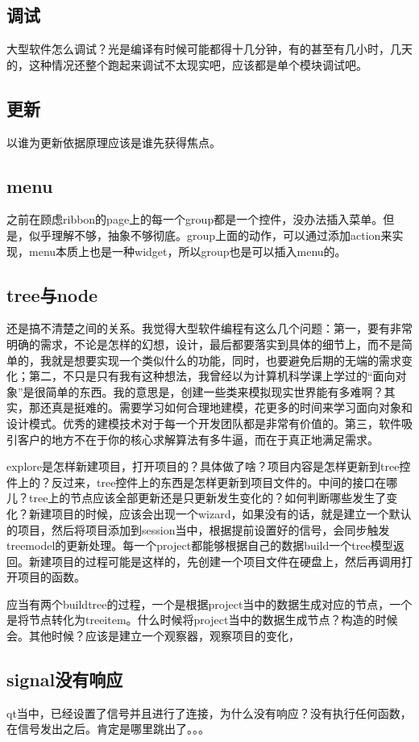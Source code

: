 \subsection{调试}
大型软件怎么调试？光是编译有时候可能都得十几分钟，有的甚至有几小时，几天的，这种情况还整个跑起来调试不太现实吧，应该都是单个模块调试吧。
\subsection{更新}
以谁为更新依据原理应该是谁先获得焦点。

\subsection{menu}
之前在顾虑ribbon的page上的每一个group都是一个控件，没办法插入菜单。但是，似乎理解不够，抽象不够彻底。group上面的动作，可以通过添加action来实现，menu本质上也是一种widget，所以group也是可以插入menu的。
\subsection{tree与node}
还是搞不清楚之间的关系。我觉得大型软件编程有这么几个问题：第一，要有非常明确的需求，不论是怎样的幻想，设计，最后都要落实到具体的细节上，而不是简单的，我就是想要实现一个类似什么的功能，同时，也要避免后期的无端的需求变化；第二，不只是只有我有这种想法，我曾经以为计算机科学课上学过的“面向对象”是很简单的东西。我的意思是，创建一些类来模拟现实世界能有多难啊？其实，那还真是挺难的。需要学习如何合理地建模，花更多的时间来学习面向对象和设计模式。优秀的建模技术对于每一个开发团队都是非常有价值的。第三，软件吸引客户的地方不在于你的核心求解算法有多牛逼，而在于真正地满足需求。

explore是怎样新建项目，打开项目的？具体做了啥？项目内容是怎样更新到tree控件上的？反过来，tree控件上的东西是怎样更新到项目文件的。中间的接口在哪儿？tree上的节点应该全部更新还是只更新发生变化的？如何判断哪些发生了变化？新建项目的时候，应该会出现一个wizard，如果没有的话，就是建立一个默认的项目，然后将项目添加到session当中，根据提前设置好的信号，会同步触发treemodel的更新处理。每一个project都能够根据自己的数据build一个tree模型返回。新建项目的过程可能是这样的，先创建一个项目文件在硬盘上，然后再调用打开项目的函数。

应当有两个buildtree的过程，一个是根据project当中的数据生成对应的节点，一个是将节点转化为treeitem。什么时候将project当中的数据生成节点？构造的时候会。其他时候？应该是建立一个观察器，观察项目的变化，

\subsection{signal没有响应}
qt当中，已经设置了信号并且进行了连接，为什么没有响应？没有执行任何函数，在信号发出之后。肯定是哪里跳出了。。。
